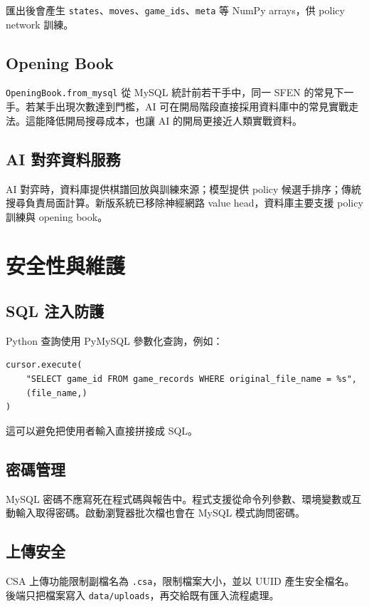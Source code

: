 \documentclass[12pt,a4paper,fontset=none]{ctexart}
\begin{document}
匯出後會產生 \texttt{states}、\texttt{moves}、\texttt{game\_ids}、\texttt{meta} 等 NumPy arrays，供 policy network 訓練。

\subsection{Opening Book}

\texttt{OpeningBook.from\_mysql} 從 MySQL 統計前若干手中，同一 SFEN 的常見下一手。若某手出現次數達到門檻，AI 可在開局階段直接採用資料庫中的常見實戰走法。這能降低開局搜尋成本，也讓 AI 的開局更接近人類實戰資料。

\subsection{AI 對弈資料服務}

AI 對弈時，資料庫提供棋譜回放與訓練來源；模型提供 policy 候選手排序；傳統搜尋負責局面計算。新版系統已移除神經網路 value head，資料庫主要支援 policy 訓練與 opening book。

\section{安全性與維護}

\subsection{SQL 注入防護}

Python 查詢使用 PyMySQL 參數化查詢，例如：

\begin{lstlisting}[style=cmd]
cursor.execute(
    "SELECT game_id FROM game_records WHERE original_file_name = %s",
    (file_name,)
)
\end{lstlisting}

這可以避免把使用者輸入直接拼接成 SQL。

\subsection{密碼管理}

MySQL 密碼不應寫死在程式碼與報告中。程式支援從命令列參數、環境變數或互動輸入取得密碼。啟動瀏覽器批次檔也會在 MySQL 模式詢問密碼。

\subsection{上傳安全}

CSA 上傳功能限制副檔名為 \texttt{.csa}，限制檔案大小，並以 UUID 產生安全檔名。後端只把檔案寫入 \texttt{data/uploads}，再交給既有匯入流程處理。
\end{document}
